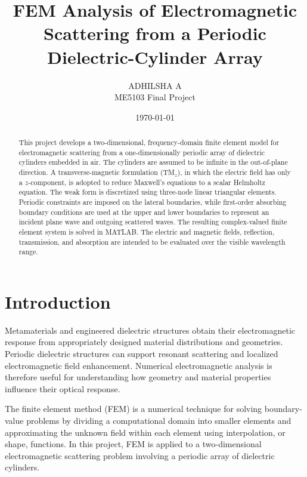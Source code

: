 \documentclass{article}
\title{\textbf{FEM Analysis of Electromagnetic Scattering
from a Periodic Dielectric-Cylinder Array}}
\author{ADHILSHA A \\ ME5103 Final Project}
\date{\today}
\begin{document}
\maketitle

\begin{abstract}
This project develops a two-dimensional, frequency-domain finite element
model for electromagnetic scattering from a one-dimensionally periodic array
of dielectric cylinders embedded in air. The cylinders are assumed to be
infinite in the out-of-plane direction. A transverse-magnetic formulation
(TM$_z$), in which the electric field has only a $z$-component, is adopted
to reduce Maxwell's equations to a scalar Helmholtz equation. The weak form
is discretized using three-node linear triangular elements. Periodic
constraints are imposed on the lateral boundaries, while first-order
absorbing boundary conditions are used at the upper and lower boundaries
to represent an incident plane wave and outgoing scattered waves. The
resulting complex-valued finite element system is solved in MATLAB. The
electric and magnetic fields, reflection, transmission, and absorption are
intended to be evaluated over the visible wavelength range.

\end{abstract}

\tableofcontents
\listoffigures
\listoftables

\chapter{Introduction}

Metamaterials and engineered dielectric structures obtain their
electromagnetic response from appropriately designed material distributions
and geometries. Periodic dielectric structures can support resonant
scattering and localized electromagnetic field enhancement. Numerical
electromagnetic analysis is therefore useful for understanding how geometry
and material properties influence their optical response.

The finite element method (FEM) is a numerical technique for solving
boundary-value problems by dividing a computational domain into smaller
elements and approximating the unknown field within each element using
interpolation, or shape, functions. In this project, FEM is applied to a
two-dimensional electromagnetic scattering problem involving a periodic
array of dielectric cylinders.
\end{document}
